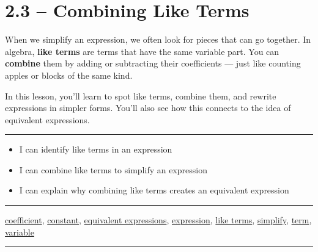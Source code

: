\documentclass[
  letterpaper,
  DIV=11,
  numbers=noendperiod]{scrreprt}
\providecommand{\tightlist}{%
  \setlength{\itemsep}{0pt}\setlength{\parskip}{0pt}}
\begin{document}
\chapter*{2.3 -- Combining Like Terms}\label{combining-like-terms}


When we simplify an expression, we often look for pieces that can go
together. In algebra, \textbf{like terms} are terms that have the same
variable part. You can \textbf{combine} them by adding or subtracting
their coefficients --- just like counting apples or blocks of the same
kind.

In this lesson, you'll learn to spot like terms, combine them, and
rewrite expressions in simpler forms. You'll also see how this connects
to the idea of equivalent expressions.

\begin{center}\rule{0.5\linewidth}{0.5pt}\end{center}

\begin{itemize}
\tightlist
\item
  I can identify like terms in an expression\\
\item
  I can combine like terms to simplify an expression\\
\item
  I can explain why combining like terms creates an equivalent
  expression\\
\end{itemize}

\begin{center}\rule{0.5\linewidth}{0.5pt}\end{center}

\href{./glossary.html\#glossary-coefficient}{coefficient},
\href{./glossary.html\#glossary-constant}{constant},
\href{./glossary.html\#glossary-equivalent-expression}{equivalent expressions},
\href{./glossary.html\#glossary-expression}{expression},
\href{./glossary.html\#glossary-like-term}{like terms},
\href{./glossary.html\#glossary-simplify}{simplify},
\href{./glossary.html\#glossary-term}{term},
\href{./glossary.html\#glossary-variable}{variable}

\begin{center}\rule{0.5\linewidth}{0.5pt}\end{center}
\end{document}
